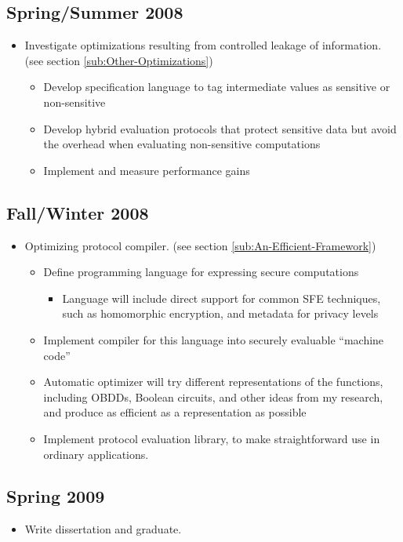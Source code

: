 \subsection{Spring/Summer 2008}
\begin{itemize}
\item Investigate optimizations resulting from controlled leakage of information.
(see section \ref{sub:Other-Optimizations})

\begin{itemize}
\item Develop specification language to tag intermediate values as sensitive
or non-sensitive
\item Develop hybrid evaluation protocols that protect sensitive data but
avoid the overhead when evaluating non-sensitive computations
\item Implement and measure performance gains
\end{itemize}
\end{itemize}

\subsection{Fall/Winter 2008}
\begin{itemize}
\item Optimizing protocol compiler. (see section \ref{sub:An-Efficient-Framework})

\begin{itemize}
\item Define programming language for expressing secure computations

\begin{itemize}
\item Language will include direct support for common SFE techniques, such
as homomorphic encryption, and metadata for privacy levels
\end{itemize}
\item Implement compiler for this language into securely evaluable {}``machine
code''
\item Automatic optimizer will try different representations of the functions,
including OBDDs, Boolean circuits, and other ideas from my research,
and produce as efficient as a representation as possible
\item Implement protocol evaluation library, to make straightforward use
in ordinary applications.
\end{itemize}
\end{itemize}

\subsection{Spring 2009}
\begin{itemize}
\item Write dissertation and graduate.
\end{itemize}

